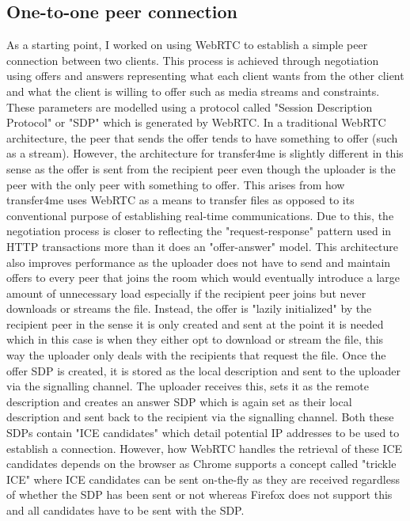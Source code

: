 \documentclass[]{report}
\begin{document}
			\subsection{One-to-one peer connection}
			As a starting point, I worked on using WebRTC to establish a simple peer connection between two clients. This process is achieved through negotiation using offers and answers representing what each client wants from the other client and what the client is willing to offer such as media streams and constraints. These parameters are modelled using a protocol called "Session Description Protocol" or "SDP" which is generated by WebRTC. In a traditional WebRTC architecture, the peer that sends the offer tends to have something to offer (such as a stream). However, the architecture for transfer4me is slightly different in this sense as the offer is sent from the recipient peer even though the uploader is the peer with the only peer with something to offer. This arises from how transfer4me uses WebRTC as a means to transfer files as opposed to its conventional purpose of establishing real-time communications. Due to this, the negotiation process is closer to reflecting the "request-response" pattern used in HTTP transactions more than it does an "offer-answer" model. This architecture also improves performance as the uploader does not have to send and maintain offers to every peer that joins the room which would eventually introduce a large amount of unnecessary load especially if the recipient peer joins but never downloads or streams the file. Instead, the offer is "lazily initialized" by the recipient peer in the sense it is only created and sent at the point it is needed which in this case is when they either opt to download or stream the file, this way the uploader only deals with the recipients that request the file. Once the offer SDP is created, it is stored as the local description and sent to the uploader via the signalling channel. The uploader receives this, sets it as the remote description and creates an answer SDP which is again set as their local description and sent back to the recipient via the signalling channel. Both these SDPs contain "ICE candidates" which detail potential IP addresses to be used to establish a connection. However, how WebRTC handles the retrieval of these ICE candidates depends on the browser as Chrome supports a concept called "trickle ICE" where ICE candidates can be sent on-the-fly as they are received regardless of whether the SDP has been sent or not whereas Firefox does not support this and all candidates have to be sent with the SDP. 
			
\end{document}
